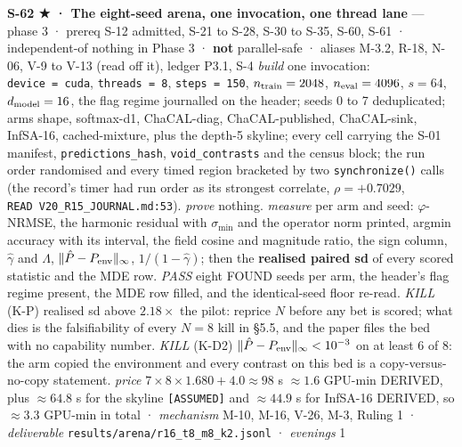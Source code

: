 \documentclass[11pt,a4paper]{article}
\theoremstyle{plain}
\theoremstyle{definition}
\theoremstyle{remark}
\begin{document}
\textbf{S-62 ★ · The eight-seed arena, one invocation, one thread lane}
--- phase 3 · prereq S-12 admitted, S-21 to S-28, S-30 to S-35, S-60,
S-61 · independent-of nothing in Phase 3 · \textbf{not} parallel-safe ·
aliases M-3.2, R-18, N-06, V-9 to V-13 (read off it), ledger P3.1, S-4
\emph{build} one invocation: \texttt{device\ =\ cuda},
\texttt{threads\ =\ 8}, \texttt{steps\ =\ 150}, \(n_{\rm train}=2048\),
\(n_{\rm eval}=4096\), \(s=64\), \(d_{\rm model}=16\), the flag regime
journalled on the header; seeds 0 to 7 deduplicated; arms shape,
softmax-d1, ChaCAL-diag, ChaCAL-published, ChaCAL-sink, InfSA-16,
cached-mixture, plus the depth-5 skyline; every cell carrying the S-01
manifest, \texttt{predictions\_hash}, \texttt{void\_contrasts} and the
census block; the run order randomised and every timed region bracketed
by two \texttt{synchronize()} calls (the record's timer had run order as
its strongest correlate, \(\rho=+0.7029\),
\texttt{READ\ V20\_R15\_JOURNAL.md:53}). \emph{prove} nothing.
\emph{measure} per arm and seed: \(\varphi\)-NRMSE, the harmonic
residual with \(\sigma_{\min}\) and the operator norm printed, argmin
accuracy with its interval, the field cosine and magnitude ratio, the
sign column, \(\hat\gamma\) and \(\Lambda\),
\(\|\hat P-P_{\rm env}\|_\infty\), \(1/(1-\hat\gamma)\); then the
\textbf{realised paired sd} of every scored statistic and the MDE row.
\emph{PASS} eight FOUND seeds per arm, the header's flag regime present,
the MDE row filled, and the identical-seed floor re-read. \emph{KILL}
(K-P) realised sd above \(2.18\times\) the pilot: reprice \(N\) before
any bet is scored; what dies is the falsifiability of every \(N=8\) kill
in §5.5, and the paper files the bed with no capability number.
\emph{KILL} (K-D2) \(\|\hat P-P_{\rm env}\|_\infty<10^{-3}\) on at least
6 of 8: the arm copied the environment and every contrast on this bed is
a copy-versus-no-copy statement. \emph{price}
\(7\times8\times1.680+4.0\approx98\) s \(\approx1.6\) GPU-min DERIVED,
plus \(\approx64.8\) s for the skyline \texttt{{[}ASSUMED{]}} and
\(\approx44.9\) s for InfSA-16 DERIVED, so \(\approx3.3\) GPU-min in
total · \emph{mechanism} M-10, M-16, V-26, M-3, Ruling 1 ·
\emph{deliverable} \texttt{results/arena/r16\_t8\_m8\_k2.jsonl} ·
\emph{evenings} 1
\end{document}
